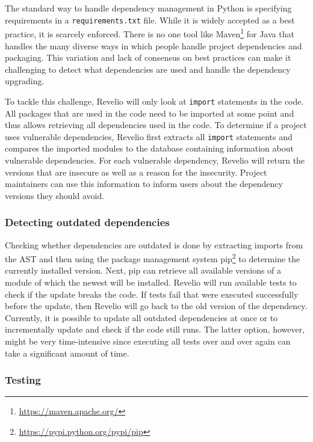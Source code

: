 The standard way to handle dependency management in Python is specifying requirements in a \texttt{requirements.txt} file. While it is widely accepted as a best practice, it is scarcely enforced. There is no one tool like Maven\footnote{\url{https://maven.apache.org/}} for Java that handles the many diverse ways in which people handle project dependencies and packaging. This variation and lack of consensus on best practices can make it challenging to detect what dependencies are used and handle the dependency upgrading. 

To tackle this challenge, Revelio will only look at \texttt{import} statements in the code. All packages that are used in the code need to be imported at some point and thus allows retrieving all dependencies used in the code.
To determine if a project uses vulnerable dependencies, Revelio first extracts all \texttt{import} statements and compares the imported modules to the database containing information about vulnerable dependencies. For each vulnerable dependency, Revelio will return the versions that are insecure as well as a reason for the insecurity. Project maintainers can use this information to inform users about the dependency versions they should avoid.

\subsubsection{Detecting outdated dependencies}

Checking whether dependencies are outdated is done by extracting imports from the AST and then using the package management system pip\footnote{\url{https://pypi.python.org/pypi/pip}} to determine the currently installed version. Next, pip can retrieve all available versions of a module of which the newest will be installed. Revelio will run available tests to check if the update breaks the code. If tests fail that were executed successfully before the update, then Revelio will go back to the old version of the dependency. Currently, it is possible to update all outdated dependencies at once or to incrementally update and check if the code still runs. The latter option, however, might be very time-intensive since executing all tests over and over again can take a significant amount of time.


\subsubsection{Testing}

